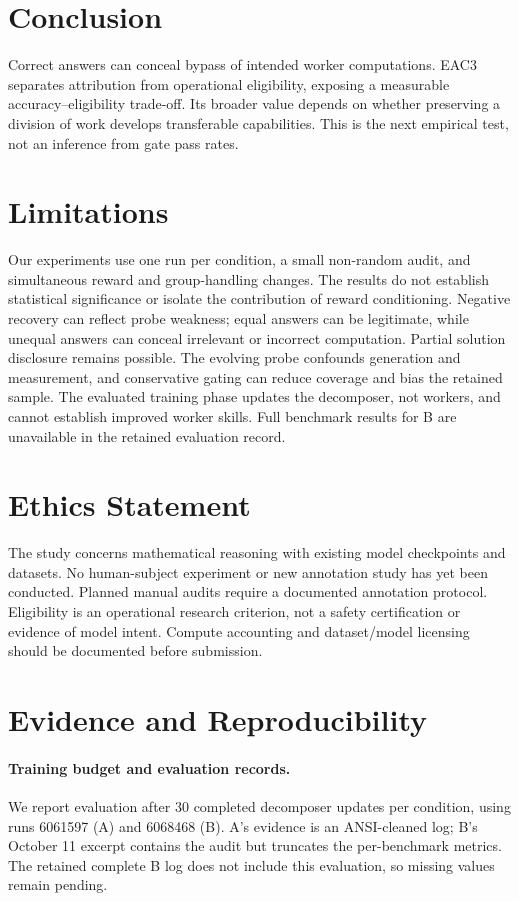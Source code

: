 \documentclass[11pt]{article}
\begin{document}
\section{Conclusion}
Correct answers can conceal bypass of intended worker computations. EAC3 separates attribution from operational eligibility, exposing a measurable accuracy--eligibility trade-off. Its broader value depends on whether preserving a division of work develops transferable capabilities. This is the next empirical test, not an inference from gate pass rates.

\section*{Limitations}
Our experiments use one run per condition, a small non-random audit, and simultaneous reward and group-handling changes. The results do not establish statistical significance or isolate the contribution of reward conditioning. Negative recovery can reflect probe weakness; equal answers can be legitimate, while unequal answers can conceal irrelevant or incorrect computation. Partial solution disclosure remains possible. The evolving probe confounds generation and measurement, and conservative gating can reduce coverage and bias the retained sample. The evaluated training phase updates the decomposer, not workers, and cannot establish improved worker skills. Full benchmark results for B are unavailable in the retained evaluation record.

\section*{Ethics Statement}
The study concerns mathematical reasoning with existing model checkpoints and datasets. No human-subject experiment or new annotation study has yet been conducted. Planned manual audits require a documented annotation protocol. Eligibility is an operational research criterion, not a safety certification or evidence of model intent. Compute accounting and dataset/model licensing should be documented before submission.



\appendix
\section{Evidence and Reproducibility}
\label{app:evidence}
\paragraph{Training budget and evaluation records.}
We report evaluation after 30 completed decomposer updates per condition, using runs 6061597 (A) and 6068468 (B). A's evidence is an ANSI-cleaned log; B's October 11 excerpt contains the audit but truncates the per-benchmark metrics. The retained complete B log does not include this evaluation, so missing values remain pending.
\end{document}
